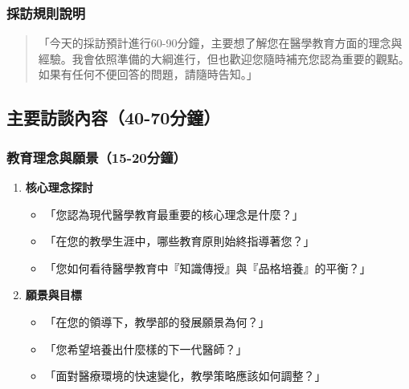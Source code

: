 \documentclass[12pt,a4paper]{article}
\begin{document}
\subsubsection{採訪規則說明}
\begin{quote}
「今天的採訪預計進行60-90分鐘，主要想了解您在醫學教育方面的理念與經驗。我會依照準備的大綱進行，但也歡迎您隨時補充您認為重要的觀點。如果有任何不便回答的問題，請隨時告知。」
\end{quote}

\newpage
\subsection{主要訪談內容（40-70分鐘）}

\subsubsection{教育理念與願景（15-20分鐘）}
\begin{enumerate}[nosep]
    \item \textbf{核心理念探討}
    \begin{itemize}[nosep]
        \item 「您認為現代醫學教育最重要的核心理念是什麼？」
        \item 「在您的教學生涯中，哪些教育原則始終指導著您？」
        \item 「您如何看待醫學教育中『知識傳授』與『品格培養』的平衡？」
    \end{itemize}

    \item \textbf{願景與目標}
    \begin{itemize}[nosep]
        \item 「在您的領導下，教學部的發展願景為何？」
        \item 「您希望培養出什麼樣的下一代醫師？」
        \item 「面對醫療環境的快速變化，教學策略應該如何調整？」
    \end{itemize}
\end{enumerate}
\end{document}

